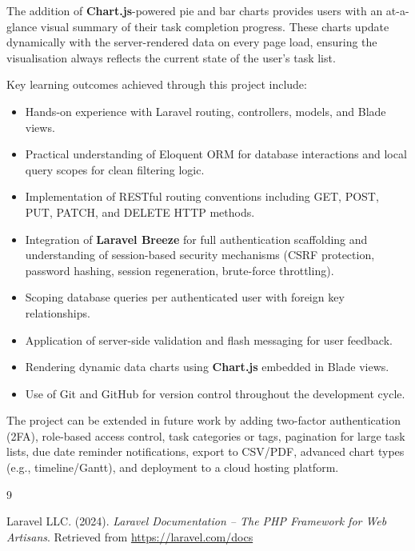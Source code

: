 \documentclass[12pt,a4paper]{report}
\begin{document}
\begin{titlepage}
The addition of \textbf{Chart.js}-powered pie and bar charts provides users with
an at-a-glance visual summary of their task completion progress. These charts update
dynamically with the server-rendered data on every page load, ensuring the
visualisation always reflects the current state of the user's task list.

Key learning outcomes achieved through this project include:
\begin{itemize}[leftmargin=1.5cm]
    \item Hands-on experience with Laravel routing, controllers, models, and
    Blade views.
    \item Practical understanding of Eloquent ORM for database interactions and
    local query scopes for clean filtering logic.
    \item Implementation of RESTful routing conventions including GET, POST, PUT,
    PATCH, and DELETE HTTP methods.
    \item Integration of \textbf{Laravel Breeze} for full authentication scaffolding
    and understanding of session-based security mechanisms (CSRF protection, password
    hashing, session regeneration, brute-force throttling).
    \item Scoping database queries per authenticated user with foreign key relationships.
    \item Application of server-side validation and flash messaging for user feedback.
    \item Rendering dynamic data charts using \textbf{Chart.js} embedded in Blade views.
    \item Use of Git and GitHub for version control throughout the development cycle.
\end{itemize}

The project can be extended in future work by adding two-factor authentication
(2FA), role-based access control, task categories or tags, pagination for large task
lists, due date reminder notifications, export to CSV/PDF, advanced chart types
(e.g., timeline/Gantt), and deployment to a cloud hosting platform.

\begin{thebibliography}{9}

Laravel LLC. (2024). \textit{Laravel Documentation -- The PHP Framework for Web
Artisans}. Retrieved from \url{https://laravel.com/docs}


\end{thebibliography}
\end{titlepage}
\end{document}
